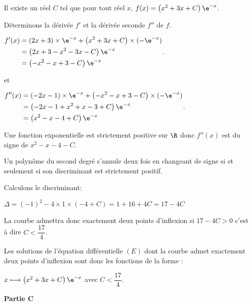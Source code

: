 \begin{enumerate}
Il existe un réel $C$ tel que pour tout réel $x$, $f(x)= \left(x^{2}+3 x+C\right) \e^{-x}$. 

Déterminons la dérivée $f'$ et la dérivée seconde $f''$ de $f$. 

$\begin{aligned}
f'(x) & = \left(2x+3\right) \times \e^{-x}+ \left(x^2+3x+C\right)\times (-\e^{-x})\\
	& = \left(2x+3-x^2-3x-C\right)\e^{-x}\\
	& =\left(-x^2-x+3-C\right)\e^{-x}
\end{aligned}$.

et

$\begin{aligned}
f''(x) & = \left(-2x-1\right) \times \e^{-x}+ \left(-x^2-x+3-C\right)\times (-\e^{-x})\\
	& = \left(-2x-1+x^2+x-3+C\right)\e^{-x}\\
	& =\left(x^2-x-4+C\right)\e^{-x}
	\end{aligned}$.

Une fonction exponentielle est strictement positive sur $\R$ donc $f''(x)$ est du signe de $x^2-x-4-C$.

Un polynôme du second degré s'annule deux fois en changeant de signe  si et seulement si son discriminant est strictement positif.

Calculons le discriminant:

$\Delta = (-1)^2 -4 \times 1 \times (-4+C) = 1+16+4C=17-4C$

La courbe admettra donc exactement deux points d'inflexion si $17- 4C > 0$ c'est à dire $C < \dfrac{17}{4}$.

Les solutions de l'équation différentielle $(E)$ dont la courbe admet exactement deux points d'inflexion sont donc les fonctions de la forme :

$x\longmapsto \left(x^{2}+3 x+C\right) \e^{-x} $  avec $C<\dfrac{17}{4}$.
\end{enumerate}

\medskip

\textbf{Partie C}

\medskip







